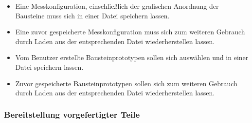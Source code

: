 \documentclass[parskip=full]{scrartcl}
\begin{document}
\begin{itemize}
		
	\item 
	\begin{MussKrit} 			
		Eine Messkonfiguration, einschließlich der grafischen Anordnung der Bausteine muss sich in einer Datei speichern lassen.
	\end{MussKrit}
	
	\item 
	\begin{MussKrit} 			
		Eine zuvor gespeicherte Messkonfiguration muss sich zum weiteren Gebrauch durch Laden aus der entsprechenden Datei wiederherstellen lassen. 
	\end{MussKrit}
	
	\item 
	\begin{SollKrit} 
		Vom Benutzer erstellte Bausteinprototypen sollen sich auswählen und in einer Datei speichern lassen.			
	\end{SollKrit}
	
	\item 
	\begin{SollKrit} 			
		Zuvor gespeicherte Bausteinprototypen sollen sich zum weiteren Gebrauch durch Laden aus der entsprechenden Datei wiederherstellen lassen. 
	\end{SollKrit}
	
\end{itemize}

\subsubsection {Bereitstellung vorgefertigter Teile}
\end{document}
